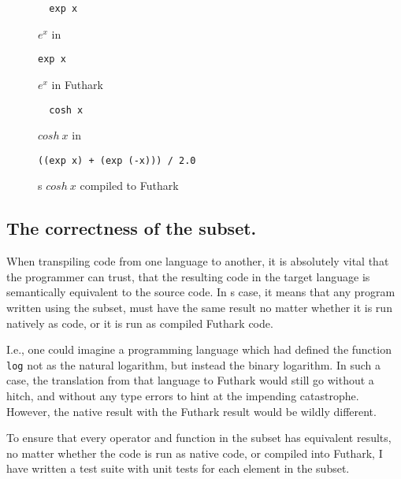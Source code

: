 \clearpage

\begin{figure}[H]
  \centering
\begin{verbatim}
  exp x
\end{verbatim}
  \caption{$e^x$ in \fsharp{}}
  \label{fig:fsharkexp}
\end{figure}

\begin{figure}[H]
  \centering
\begin{lstlisting}[language=Futhark]
  exp x
\end{lstlisting}
  \caption{$e^x$ in Futhark}
  \label{fig:futharkexp}
\end{figure}

\begin{figure}[H]
  \centering
\begin{verbatim}
  cosh x
\end{verbatim}
  \caption{$cosh~ x$ in \fsharp{}}
  \label{fig:fsharkcosh}
\end{figure}
\begin{figure}[H]
  \centering
\begin{lstlisting}[language=Futhark]
  ((exp x) + (exp (-x))) / 2.0
\end{lstlisting}
\caption{\fshark{}s $cosh~ x$ compiled to Futhark}
  \label{fig:futharkcosh}
\end{figure}

\clearpage
\subsection*{The correctness of the \fshark{} subset.}
When transpiling code from one language to another, it is absolutely vital that
the programmer can trust, that the resulting code in the target language is
semantically equivalent to the source code.
In \fshark{}s case, it means that any program written using the \fshark{}
subset, must have the same result no matter whether it is run natively as
\fsharp{} code, or it is run as \fshark{} compiled Futhark code.

I.e., one could imagine a programming language which had defined the function
\texttt{log} not as the natural logarithm, but instead the binary logarithm. In
such a case, the translation from that language to Futhark would still go
without a hitch, and without any type errors to hint at the impending
catastrophe.
However, the native result with the Futhark result would be wildly different.

To ensure that every operator and function in the \fshark{} subset has
equivalent results, no matter whether the \fshark{} code is run as native
\fsharp{} code, or compiled into Futhark, I have written a test suite with unit
tests for each element in the \fsharp{} subset. 



